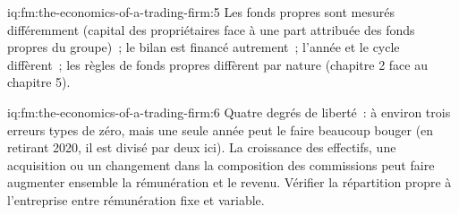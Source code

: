 \begin{solution}{iq:fm:the-economics-of-a-trading-firm:5}
Les fonds propres sont mesurés différemment (capital des propriétaires face à une part attribuée des fonds propres du groupe)~; le bilan est financé autrement~;
l'année et le cycle diffèrent~; les règles de fonds propres diffèrent par nature (chapitre 2 face au chapitre 5).
\end{solution}

\begin{solution}{iq:fm:the-economics-of-a-trading-firm:6}
Quatre degrés de liberté~: à environ trois erreurs types de zéro, mais une seule année peut le faire beaucoup bouger (en retirant 2020, il est divisé par deux ici). La croissance des effectifs, une
acquisition ou un changement dans la composition des commissions peut faire augmenter ensemble la rémunération et le revenu. Vérifier la répartition propre à l'entreprise entre rémunération fixe et variable.
\end{solution}
